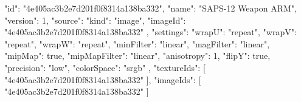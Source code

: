 {
  "id": "4e405ac3b2e7d201f0f8314a138ba332",
  "name": "SAPS-12 Weapon ARM",
  "version": 1,
  "source": {
    "kind": "image",
    "imageId": "4e405ac3b2e7d201f0f8314a138ba332"
  },
  "settings": {
    "wrapU": "repeat",
    "wrapV": "repeat",
    "wrapW": "repeat",
    "minFilter": "linear",
    "magFilter": "linear",
    "mipMap": true,
    "mipMapFilter": "linear",
    "anisotropy": 1,
    "flipY": true,
    "precision": "low",
    "colorSpace": "srgb"
  },
  "textureIds": [
    "4e405ac3b2e7d201f0f8314a138ba332"
  ],
  "imageIds": [
    "4e405ac3b2e7d201f0f8314a138ba332"
  ]
}
